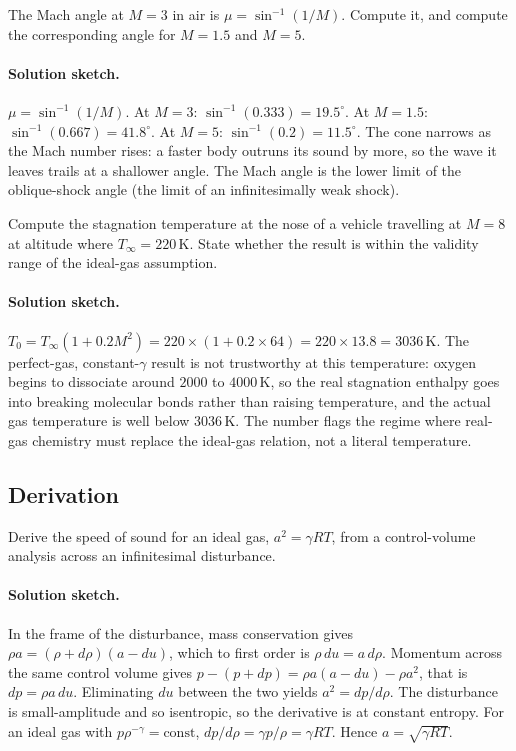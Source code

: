 \begin{exercise}
The Mach angle at $M = 3$ in air is $\mu = \sin^{-1}(1/M)$.
Compute it, and compute the corresponding angle for $M = 1.5$ and
$M = 5$.
\paragraph{Solution sketch.} $\mu = \sin^{-1}(1/M)$. At $M = 3$:
$\sin^{-1}(0.333) = 19.5^{\circ}$. At $M = 1.5$: $\sin^{-1}(0.667) =
41.8^{\circ}$. At $M = 5$: $\sin^{-1}(0.2) = 11.5^{\circ}$. The cone
narrows as the Mach number rises: a faster body outruns its sound by
more, so the wave it leaves trails at a shallower angle. The Mach
angle is the lower limit of the oblique-shock angle (the limit of an
infinitesimally weak shock).
\end{exercise}

\begin{exercise}
Compute the stagnation temperature at the nose of a vehicle
travelling at $M = 8$ at altitude where $T_\infty = 220\,\si{
\kelvin}$. State whether the result is within the validity range
of the ideal-gas assumption.
\paragraph{Solution sketch.} $T_0 = T_\infty(1 + 0.2 M^2) =
220\times(1 + 0.2\times 64) = 220\times 13.8 = 3036\,\si{\kelvin}$.
The perfect-gas, constant-$\gamma$ result is not trustworthy at this
temperature: oxygen begins to dissociate around $2000$ to
$4000\,\si{\kelvin}$, so the real stagnation enthalpy goes into
breaking molecular bonds rather than raising temperature, and the
actual gas temperature is well below $3036\,\si{\kelvin}$. The number
flags the regime where real-gas chemistry must replace the ideal-gas
relation, not a literal temperature.
\end{exercise}

\subsection*{Derivation}

\begin{exercise}
Derive the speed of sound for an ideal gas, $a^2 = \gamma R T$,
from a control-volume analysis across an infinitesimal disturbance.
\paragraph{Solution sketch.} In the frame of the disturbance, mass
conservation gives $\rho a = (\rho + d\rho)(a - du)$, which to first
order is $\rho\,du = a\,d\rho$. Momentum across the same control
volume gives $p - (p + dp) = \rho a(a - du) - \rho a^2$, that is
$dp = \rho a\,du$. Eliminating $du$ between the two yields $a^2 =
dp/d\rho$. The disturbance is small-amplitude and so isentropic, so
the derivative is at constant entropy. For an ideal gas with
$p\rho^{-\gamma} = \text{const}$, $dp/d\rho = \gamma p/\rho = \gamma
RT$. Hence $a = \sqrt{\gamma RT}$.
\end{exercise}

